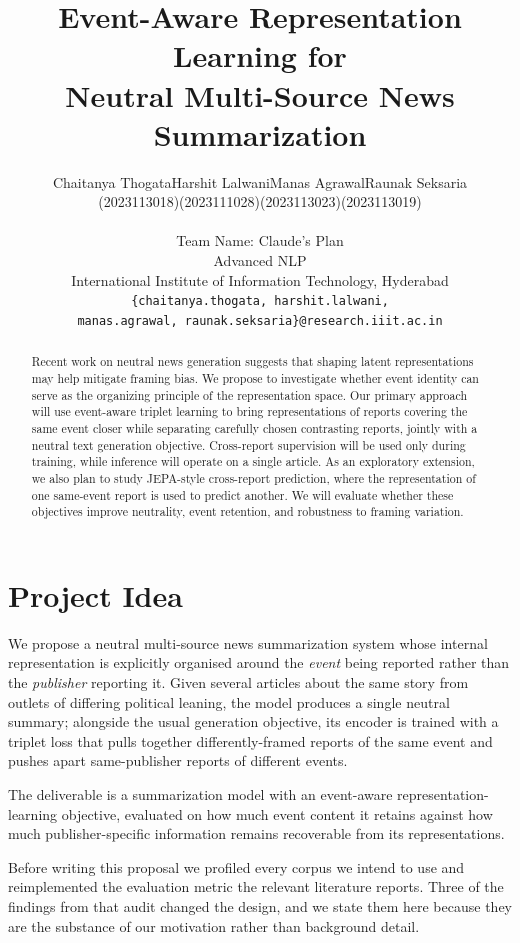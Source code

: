 \documentclass[11pt]{article}
\title{Event-Aware Representation Learning for\\
Neutral Multi-Source News Summarization}
\author{
  \begin{tabular}{@{}cccc@{}}
    Chaitanya Thogata & Harshit Lalwani & Manas Agrawal & Raunak Seksaria \\
    {\normalfont (2023113018)} & {\normalfont (2023111028)} &
    {\normalfont (2023113023)} & {\normalfont (2023113019)} \\
  \end{tabular} \\[3pt]
  Team Name: Claude's Plan \\[1pt]
  {\normalfont Advanced NLP} \\[1pt]
  {\normalfont International Institute of Information Technology, Hyderabad} \\[1pt]
  {\normalfont\small\texttt{\{chaitanya.thogata, harshit.lalwani,}} \\
  {\normalfont\small\texttt{manas.agrawal, raunak.seksaria\}@research.iiit.ac.in}}
}
\begin{document}
\maketitle

\begin{abstract}
Recent work on neutral news generation suggests that shaping latent
representations may help mitigate framing bias. We propose to investigate
whether event identity can serve as the organizing principle of the
representation space. Our primary approach will use event-aware triplet
learning to bring representations of reports covering the same event closer
while separating carefully chosen contrasting reports, jointly with a neutral
text generation objective. Cross-report supervision will be used only during
training, while inference will operate on a single article. As an exploratory
extension, we also plan to study JEPA-style cross-report prediction, where the
representation of one same-event report is used to predict another. We will
evaluate whether these objectives improve neutrality, event retention, and
robustness to framing variation.
\end{abstract}

\section{Project Idea}

We propose a neutral multi-source news summarization system whose internal
representation is explicitly organised around the \emph{event} being reported
rather than the \emph{publisher} reporting it. Given several articles about the
same story from outlets of differing political leaning, the model produces a
single neutral summary; alongside the usual generation objective, its encoder is
trained with a triplet loss that pulls together differently-framed reports of the
same event and pushes apart same-publisher reports of different events.

The deliverable is a summarization model with an event-aware
representation-learning objective, evaluated on how much event content it
retains against how much publisher-specific information remains recoverable from
its representations.

Before writing this proposal we profiled every corpus we intend to use and
reimplemented the evaluation metric the relevant literature reports. Three of the
findings from that audit changed the design, and we state them here because they
are the substance of our motivation rather than background detail.
\end{document}
